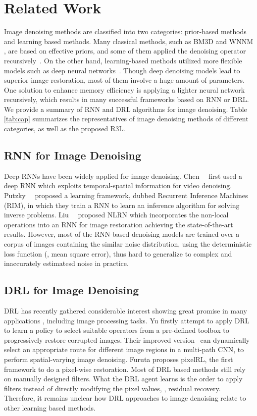 \documentclass{article}
\begin{document}
\section{Related Work}
Image denoising methods are classified into two categories: prior-based methods and learning based methods. Many classical methods, such as BM3D \cite{dabov2007image} and WNNM \cite{6909762}, are based on effective priors, and some of them applied the denoising operator recursively~\cite{6909762}.
On the other hand, learning-based methods utilized more flexible models such as deep neural networks~\cite{guo2019toward, Zhang_2017,zhang2018ffdnet}. Though deep denoising models lead to superior image restoration, most of them involve a huge amount of parameters. One solution to enhance memory efficiency is applying a lighter neural network recursively, which results in many successful frameworks based on RNN or DRL. We provide a summary of RNN and DRL algorithms for image denoising. 
Table \ref{tab:cap} summarizes the representatives of image denoising methods of different categories, as well as the proposed R3L.  
\subsection{RNN for Image Denoising}
Deep RNNs have been widely applied for image denoising. Chen~\etal~\cite{chen2016deep} first used a deep RNN which exploits temporal-spatial information for video denoising. Putzky~\etal~\cite{putzky2017recurrent} proposed a learning framework, dubbed Recurrent Inference Machines (RIM), in which they train a RNN to learn an inference algorithm for solving inverse problems. Liu~\etal~\cite{liu2018non} proposed NLRN which incorporates the non-local operations into an RNN for image restoration achieving the state-of-the-art results. 
However, most of the RNN-based denoising models are trained over a corpus of images containing the similar noise distribution, using the deterministic loss function (\eg, mean square error), thus hard to generalize to complex and inaccurately estimatesd noise in practice.
\subsection{DRL for Image Denoising}
DRL has recently gathered considerable interest showing great promise in many applications \cite{silver2016mastering}, including image processing tasks. Yu \etal \cite{yu2018crafting} firstly attempt to apply DRL to learn a policy to select suitable operators from a pre-defined toolbox to progressively restore corrupted images. 
Their improved version~\cite{yu2019pathrestore} can dynamically select an appropriate route for different image regions in a multi-path CNN, to perform spatial-varying image denoising. 
Furuta \etal \cite{furuta2019fully}  proposes pixelRL, the first framework to do a pixel-wise restoration. Most of DRL based methods still rely on manually designed filters. What the DRL agent learns is the order to apply filters instead of directly modifying the pixel values, \ie, residual recovery. Therefore, it remains unclear how DRL approaches to image denoising relate to other learning based methods.
\end{document}
